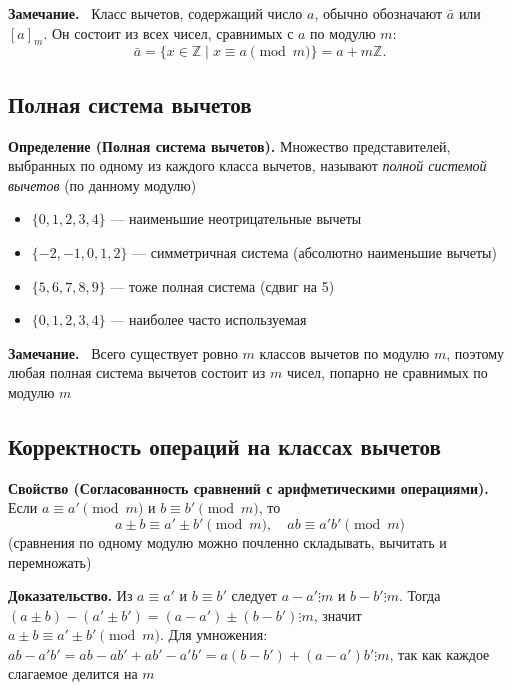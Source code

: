 \documentclass[a4paper,12pt]{article}
\newcommand{\myremark}{\textbf{Замечание.}\ }
\theoremstyle{definition}
\theoremstyle{plain}
\theoremstyle{remark}
\begin{document}
	\myremark
	Класс вычетов, содержащий число $a$, обычно обозначают $\bar{a}$ или $[a]_m$. Он состоит из всех чисел, сравнимых с $a$ по модулю $m$:
	\[
	\bar{a} = \{x \in \mathbb{Z} \mid x \equiv a \pmod{m}\} = a + m\mathbb{Z}.
	\]
	
	\subsection{Полная система вычетов}
	
	\noindent \textbf{Определение (Полная система вычетов).}
	Множество представителей, выбранных по одному из каждого класса вычетов, называют \textit{полной системой вычетов} (по данному модулю)
	
	\begin{tcolorbox}[colback=gray!5, colframe=gray!50, title=Примеры полных систем вычетов по модулю 5]
		\begin{itemize}
			\item $\{0, 1, 2, 3, 4\}$ — наименьшие неотрицательные вычеты
			\item $\{-2, -1, 0, 1, 2\}$ — симметричная система (абсолютно наименьшие вычеты)
			\item $\{5, 6, 7, 8, 9\}$ — тоже полная система (сдвиг на 5)
			\item $\{0, 1, 2, 3, 4\}$ — наиболее часто используемая
		\end{itemize}
	\end{tcolorbox}
	
	\myremark
	Всего существует ровно $m$ классов вычетов по модулю $m$, поэтому любая полная система вычетов состоит из $m$ чисел, попарно не сравнимых по модулю $m$
	
	\subsection{Корректность операций на классах вычетов}
	
	\noindent \textbf{Свойство (Согласованность сравнений с арифметическими операциями).}
	Если $a \equiv a' \pmod{m}$ и $b \equiv b' \pmod{m}$, то
	\[
	a \pm b \equiv a' \pm b' \pmod{m}, \quad ab \equiv a'b' \pmod{m}
	\]
	(сравнения по одному модулю можно почленно складывать, вычитать и перемножать)
	
	\medskip
	\noindent \textbf{Доказательство.}
	Из $a \equiv a'$ и $b \equiv b'$ следует $a - a' \vdots m$ и $b - b' \vdots m$.
	Тогда $(a \pm b) - (a' \pm b') = (a - a') \pm (b - b') \vdots m$, значит $a \pm b \equiv a' \pm b' \pmod{m}$.
	Для умножения: $ab - a'b' = ab - ab' + ab' - a'b' = a(b - b') + (a - a')b' \vdots m$, так как каждое слагаемое делится на $m$
	
\end{document}
